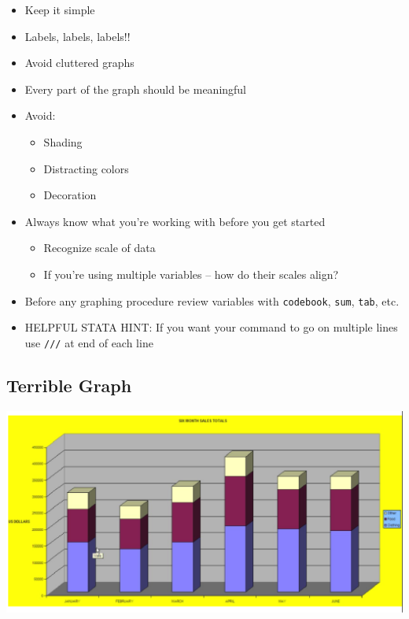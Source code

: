 \documentclass[
]{book}
\providecommand{\tightlist}{%
  \setlength{\itemsep}{0pt}\setlength{\parskip}{0pt}}
\begin{document}
\begin{itemize}
\tightlist
\item
  Keep it simple
\item
  Labels, labels, labels!!
\item
  Avoid cluttered graphs
\item
  Every part of the graph should be meaningful
\item
  Avoid:

  \begin{itemize}
  \tightlist
  \item
    Shading
  \item
    Distracting colors
  \item
    Decoration
  \end{itemize}
\item
  Always know what you're working with before you get started

  \begin{itemize}
  \tightlist
  \item
    Recognize scale of data
  \item
    If you're using multiple variables -- how do their scales align?
  \end{itemize}
\item
  Before any graphing procedure review variables with \texttt{codebook}, \texttt{sum}, \texttt{tab}, etc.
\item
  HELPFUL STATA HINT: If you want your command to go on multiple lines use \texttt{///} at end of each line
\end{itemize}

\hypertarget{terrible-graph}{%
\subsection{Terrible Graph}\label{terrible-graph}}

\includegraphics{Stata/StataModGraph/images/Terrible.png}
\end{document}
